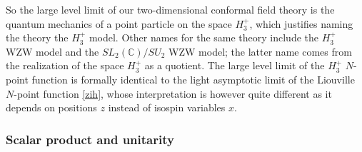 \documentclass[12pt, a4paper, notitlepage, twoside]{report}
\numberwithin{equation}{section}
\theoremstyle{break}
\begin{document}
So the large level limit of our two-dimensional conformal field theory is the quantum mechanics of a point particle on the space $H_3^+$, which justifies naming the theory the $H_3^+$ model.
Other names for the same theory include the $H_3^+$ WZW model and the $SL_2({\mathbb{C}})/SU_2$ WZW model; the latter name comes from the realization of the space $H_3^+$ as a quotient.
The large level limit of the $H_3^+$ $N$-point function is formally identical to the light asymptotic limit of the Liouville $N$-point function \eqref{zih}, whose interpretation is however quite different as it depends on positions $z$ instead of isospin variables $x$.


\subsubsection{Scalar product and unitarity}
\end{document}

